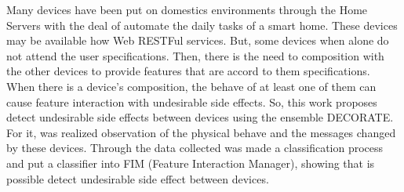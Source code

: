 Many devices have been put on domestics environments through the Home Servers with the deal of automate the daily tasks of a smart home. These devices may be available how Web RESTFul services. But, some devices when alone do not attend the user specifications. Then, there is the need to composition with the other devices to provide features that are accord to them specifications. When there is a device's composition, the behave of at least one of them can cause feature interaction with undesirable side effects. So, this work proposes detect undesirable side effects between devices using the ensemble DECORATE. For it, was realized observation of the physical behave and the messages changed by these devices. Through the data collected was made a classification process and put a classifier into FIM (Feature Interaction Manager), showing that is possible detect undesirable side effect between devices.
